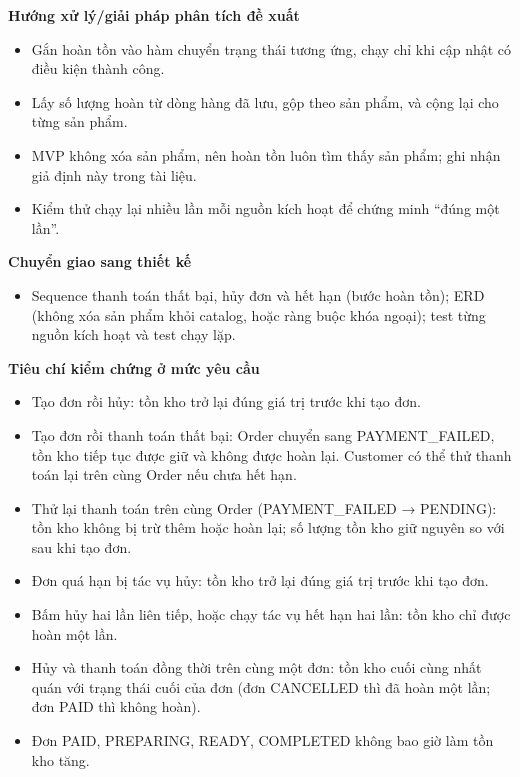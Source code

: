 \documentclass[11pt,a4paper,oneside]{report}
\begin{document}
\textbf{Hướng xử lý/giải pháp phân tích đề xuất}

\begin{itemize}
\item
  Gắn hoàn tồn vào hàm chuyển trạng thái tương ứng, chạy chỉ khi cập nhật có điều kiện thành công.
\item
  Lấy số lượng hoàn từ dòng hàng đã lưu, gộp theo sản phẩm, và cộng lại cho từng sản phẩm.
\item
  MVP không xóa sản phẩm, nên hoàn tồn luôn tìm thấy sản phẩm; ghi nhận giả định này trong tài liệu.
\item
  Kiểm thử chạy lại nhiều lần mỗi nguồn kích hoạt để chứng minh ``đúng một lần''.
\end{itemize}

\textbf{Chuyển giao sang thiết kế}

\begin{itemize}
\item
  Sequence thanh toán thất bại, hủy đơn và hết hạn (bước hoàn tồn); ERD (không xóa sản phẩm khỏi catalog, hoặc ràng buộc khóa ngoại); test từng nguồn kích hoạt và test chạy lặp.
\end{itemize}

\textbf{Tiêu chí kiểm chứng ở mức yêu cầu}

\begin{itemize}
\item
  Tạo đơn rồi hủy: tồn kho trở lại đúng giá trị trước khi tạo đơn.
\item
  Tạo đơn rồi thanh toán thất bại: Order chuyển sang PAYMENT\_FAILED, tồn kho tiếp tục được giữ và không được hoàn lại. Customer có thể thử thanh toán lại trên cùng Order nếu chưa hết hạn.
\item
  Thử lại thanh toán trên cùng Order (PAYMENT\_FAILED → PENDING): tồn kho không bị trừ thêm hoặc hoàn lại; số lượng tồn kho giữ nguyên so với sau khi tạo đơn.
\item
  Đơn quá hạn bị tác vụ hủy: tồn kho trở lại đúng giá trị trước khi tạo đơn.
\item
  Bấm hủy hai lần liên tiếp, hoặc chạy tác vụ hết hạn hai lần: tồn kho chỉ được hoàn một lần.
\item
  Hủy và thanh toán đồng thời trên cùng một đơn: tồn kho cuối cùng nhất quán với trạng thái cuối của đơn (đơn CANCELLED thì đã hoàn một lần; đơn PAID thì không hoàn).
\item
  Đơn PAID, PREPARING, READY, COMPLETED không bao giờ làm tồn kho tăng.
\end{itemize}
\end{document}
